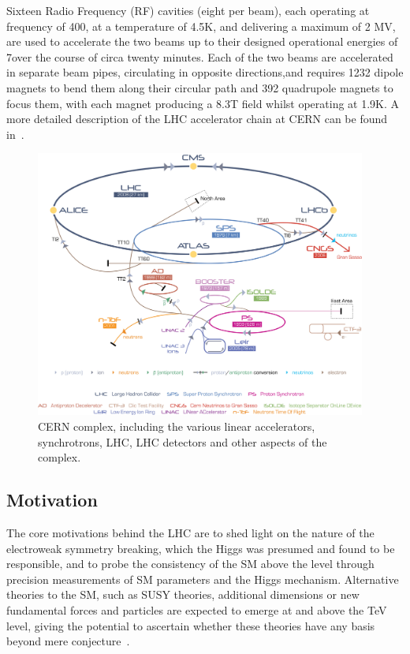 Sixteen Radio Frequency (RF) cavities (eight per beam), each operating at frequency of 400\MHz, at a temperature of 4.5K, and delivering a maximum of 2 MV, are used to accelerate the two beams up to their designed operational energies of 7\TeV over the course of circa twenty minutes.
Each of the two beams are accelerated in separate beam pipes, circulating in opposite directions,and requires 1232 dipole magnets to bend them along their circular path and 392 quadrupole magnets to focus them, with each magnet producing a 8.3T field whilst operating at 1.9K.
A more detailed description of the LHC accelerator chain at CERN can be found in~\cite{Schindl:397574}. 

\begin{figure}[htbp]
\begin{center}
\includegraphics[width=0.97\textwidth]{figs/lhc/Cern-Accelerator-Complex.jpg}
\caption{CERN complex, including the various linear accelerators, synchrotrons, LHC, LHC detectors and other aspects of the complex.}
\label{fig:cern-accelerator-complex}
\end{center}
\end{figure}

\subsection{Motivation}
The core motivations behind the LHC are to shed light on the nature of the electroweak symmetry breaking, which the Higgs was presumed and found to be responsible, and to probe the consistency of the SM above the \TeV level through precision measurements of SM parameters and the Higgs mechanism.
Alternative theories to the SM, such as SUSY theories, additional dimensions or new fundamental forces and particles are expected to emerge at and above the TeV level, giving the potential to ascertain whether these theories have any basis beyond mere conjecture~\cite{Bayatian:2006zz}.

